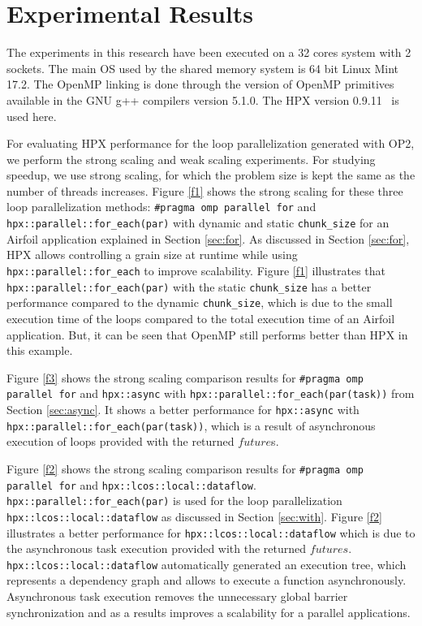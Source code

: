 \documentclass[conference]{IEEEtran}
\begin{document}

\section{Experimental Results}
\label{sec:res}

The experiments in this research have been executed on a 32 cores system with 2 sockets. The main OS used by the shared memory system is 64 bit Linux Mint 17.2. The OpenMP linking is done through the version of OpenMP primitives available in the GNU g++ compilers version 5.1.0. The HPX version 0.9.11~\cite{hpx_v0.9.11} is used here.
 
For evaluating HPX performance for the loop parallelization generated with OP2, we perform the strong scaling and weak scaling experiments. For studying speedup, we use strong scaling, for which the problem size is kept the same as the number of threads increases. Figure \ref{f1} shows the strong scaling for these three loop parallelization methods: \texttt{\#pragma omp parallel for} and \texttt{hpx::parallel::for\_each(par)} with dynamic and static \texttt{chunk\_size} for an Airfoil application explained in Section \ref{sec:for}. As discussed in Section \ref{sec:for}, HPX allows controlling a grain size at runtime while using \texttt{hpx::parallel::for\_each} to improve scalability. Figure \ref{f1} illustrates that \texttt{hpx::parallel::for\_each(par)} with the static \texttt{chunk\_size} has a better performance compared to the dynamic \texttt{chunk\_size}, which is due to the small execution time of the loops compared to the total execution time of an Airfoil application. But, it can be seen that OpenMP still performs better than HPX in this example.


Figure \ref{f3} shows the strong scaling comparison results for \texttt{\#pragma omp parallel for} and \texttt{hpx::async} with \texttt{hpx::parallel::for\_each(par(task))} from Section \ref{sec:async}. It shows a better performance for \texttt{hpx::async} with \texttt{hpx::parallel::for\_each(par(task))}, which is a result of asynchronous execution of loops provided with the returned $future$s.


Figure \ref{f2} shows the strong scaling comparison results for \texttt{\#pragma omp parallel for} and \texttt{hpx::lcos::local::dataflow}. \texttt{hpx::parallel::for\_each(par)} is used for the loop parallelization \texttt{hpx::lcos::local::dataflow} as discussed in Section \ref{sec:with}. Figure \ref{f2} illustrates a better performance for \texttt{hpx::lcos::local::dataflow} which is due to the asynchronous task execution provided with the returned $futures$. \texttt{hpx::lcos::local::dataflow} automatically generated an execution tree, which represents a dependency graph and allows to execute a function asynchronously. Asynchronous task execution removes the unnecessary global barrier synchronization and as a results improves a scalability for a parallel applications.    
\end{document}
